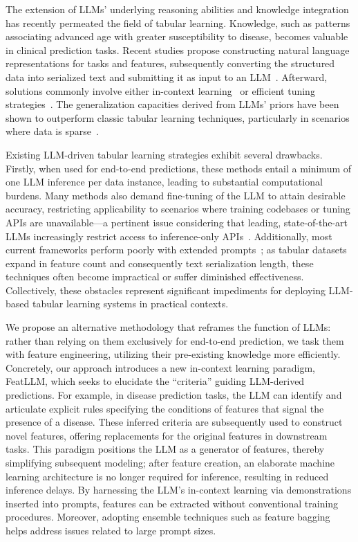 The extension of LLMs’ underlying reasoning abilities and knowledge integration has recently permeated the field of tabular learning. Knowledge, such as patterns associating advanced age with greater susceptibility to disease, becomes valuable in clinical prediction tasks. Recent studies propose constructing natural language representations for tasks and features, subsequently converting the structured data into serialized text and submitting it as input to an LLM~\cite{dinh2022lift,wang2023anypredict}. Afterward, solutions commonly involve either in-context learning~\cite{nam2023semi} or efficient tuning strategies~\cite{dinh2022lift,hegselmann2023tabllm}. The generalization capacities derived from LLMs’ priors have been shown to outperform classic tabular learning techniques, particularly in scenarios where data is sparse~\cite{hegselmann2023tabllm}.

Existing LLM-driven tabular learning strategies exhibit several drawbacks. Firstly, when used for end-to-end predictions, these methods entail a minimum of one LLM inference per data instance, leading to substantial computational burdens. Many methods also demand fine-tuning of the LLM to attain desirable accuracy, restricting applicability to scenarios where training codebases or tuning APIs are unavailable—a pertinent issue considering that leading, state-of-the-art LLMs increasingly restrict access to inference-only APIs~\cite{anil2023palm,openai2023gpt4}. Additionally, most current frameworks perform poorly with extended prompts~\cite{liu2023lost}; as tabular datasets expand in feature count and consequently text serialization length, these techniques often become impractical or suffer diminished effectiveness. Collectively, these obstacles represent significant impediments for deploying LLM-based tabular learning systems in practical contexts.

We propose an alternative methodology that reframes the function of LLMs: rather than relying on them exclusively for end-to-end prediction, we task them with feature engineering, utilizing their pre-existing knowledge more efficiently. Concretely, our approach introduces a new in-context learning paradigm, \textsf{FeatLLM}, which seeks to elucidate the “criteria” guiding LLM-derived predictions. For example, in disease prediction tasks, the LLM can identify and articulate explicit rules specifying the conditions of features that signal the presence of a disease. These inferred criteria are subsequently used to construct novel features, offering replacements for the original features in downstream tasks. This paradigm positions the LLM as a generator of features, thereby simplifying subsequent modeling; after feature creation, an elaborate machine learning architecture is no longer required for inference, resulting in reduced inference delays. By harnessing the LLM's in-context learning via demonstrations inserted into prompts, features can be extracted without conventional training procedures. Moreover, adopting ensemble techniques such as feature bagging~\cite{breiman2001random} helps address issues related to large prompt sizes.

